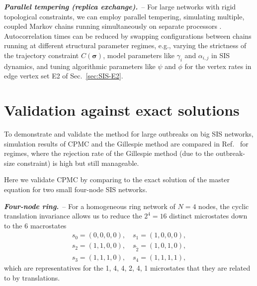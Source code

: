 \documentclass[english,10pt,aps,pra,twocolumn,superscriptaddress,floatfix,fleqn]{revtex4-2}
\renewcommand{\vec}[1]{{\boldsymbol{#1}}}
\newcommand{\vs}{\vec{\sigma}}
\newcommand{\Emph}[1]{\emph{\textbf{#1}}}
\begin{document}
\Emph{Parallel tempering (replica exchange).}~--
For large networks with rigid topological constraints, we can employ parallel tempering, simulating multiple, coupled Markov chains running simultaneously on separate processors \cite{Note4}. Autocorrelation times can be reduced by swapping configurations between chains running at different structural parameter regimes, e.g., varying the strictness of the trajectory constraint $C(\vs)$, model parameters like $\gamma_i$ and $\alpha_{i,j}$ in SIS dynamics, and tuning algorithmic parameters like $\psi$ and $\phi$ for the vertex rates in edge vertex set \textsc{E2} of Sec.~\ref{sec:SIS-E2}.


\section{Validation against exact solutions}\label{sec:validate}
To demonstrate and validate the method for large outbreaks on big SIS networks, simulation results of CPMC and the Gillespie method are compared in Ref.~\cite{Sun2026_08} for regimes, where the rejection rate of the Gillespie method (due to the outbreak-size constraint) is high but still manageable.

Here we validate CPMC by comparing to the exact solution of the master equation for two small four-node SIS networks.

\Emph{Four-node ring.}~--
For a homogeneous ring network of $N=4$ nodes, the  cyclic translation invariance allows us to reduce the $2^4 = 16$ distinct microstates down to the $6$ macrostates
\begin{subequations}\label{eq:ringStates}
\begin{gather}
	s_0=(0,0,0,0),\quad s_1=(1,0,0,0),\\
	s_2=(1,1,0,0),\quad s_{\tilde{2}}=(1,0,1,0),\\
	s_3=(1,1,1,0),\quad s_4=(1,1,1,1),
\end{gather}
\end{subequations}
which are representatives for the 1, 4, 4, 2, 4, 1 microstates that they are related to by translations.
\end{document}
